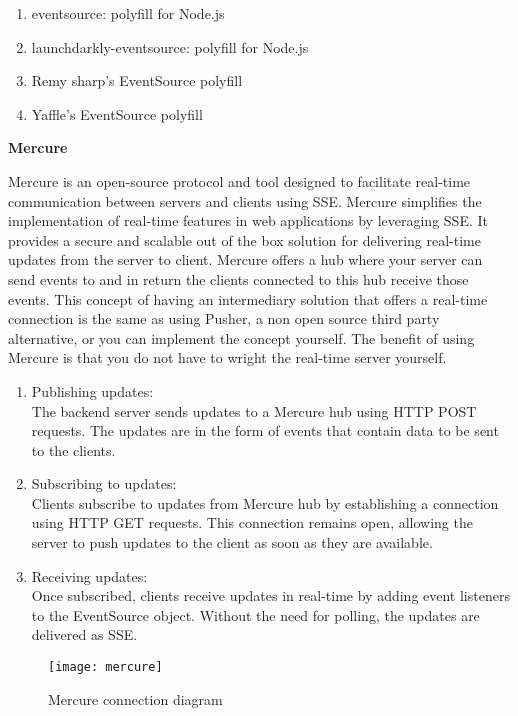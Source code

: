\begin{enumerate}
    \item eventsource: polyfill for Node.js
    \item launchdarkly-eventsource: polyfill for Node.js
    \item Remy sharp's EventSource polyfill
    \item Yaffle's EventSource polyfill
\end{enumerate}

\textbf{Mercure}

Mercure is an open-source protocol and tool designed to facilitate real-time communication between servers and clients using SSE. Mercure simplifies the implementation of real-time features in web applications by leveraging SSE. It provides a secure and scalable out of the box solution for delivering real-time updates from the server to client. Mercure offers a hub where your server can send events to and in return the clients connected to this hub receive those events. This concept of having an intermediary solution that offers a real-time connection is the same as using Pusher, a non open source third party alternative, or you can implement the concept yourself. The benefit of using Mercure is that you do not have to wright the real-time server yourself.

\begin{enumerate}
    \item Publishing updates: \\ The backend server sends updates to a Mercure hub using HTTP POST requests. The updates are in the form of events that contain data to be sent to the clients.
    \item Subscribing to updates: \\ Clients subscribe to updates from Mercure hub by establishing a connection using HTTP GET requests. This connection remains open, allowing the server to push updates to the client as soon as they are available.
    \item Receiving updates: \\ Once subscribed, clients receive updates in real-time by adding event listeners to the EventSource object. Without the need for polling, the updates are delivered as SSE.
\end{enumerate}

\begin{figure}[h]
  \caption{Mercure connection diagram}
  \texttt{[image: mercure]}
  \centering
\end{figure}

